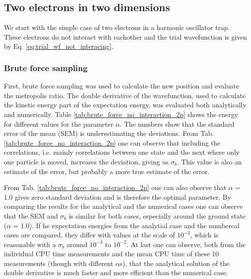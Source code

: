 \subsection{Two electrons in two dimensions}

We start with the simple case of two electrons in a harmonic oscillator trap. These electrons do not interact with eachother and the trial wavefunction is given by Eq. \ref{eq:trial_wf_not_interacing}. 

\subsubsection{Brute force sampling}

First, brute force sampling was used to calculate the new position and evaluate the metropolis ratio. The double derivative of the wavefunction, used to calculate the kinetic energy part of the expectation energy, was evaluated both analytically and numerically. Table \ref{tab:brute_force_no_interaction_2p} shows the energy for different values for the parameter $\alpha$. The numbers show that the standard error of the mean (SEM) is underestimating the deviations. From Tab. \ref{tab:brute_force_no_interaction_2p} one can observe that including the correlations, i.e. mainly correlations between one state and the next where only one particle is moved, increases the deviation, giving us $\sigma_b$. This value is also an estimate of the error, but probably a more true estimate of the error.

From Tab. \ref{tab:brute_force_no_interaction_2p} one can also observe that $\alpha $ = 1.0 gives zero standard deviation and is therefore the optimal parameter. By comparing the results for the analytical and the numerical cases one can observe that the SEM and $\sigma_b$ is similar for both cases, especially around the ground state ($\alpha$ = 1.0). If he expectation energies from the analytial case and the numbercal cases are compared, they differ with values at the scale of $10^{-3}$, which is reasonable with a $\sigma_b$ around $10^{-3}$ to $10^{-2}$. At last one can observe, both from the individual CPU time measurements and the mean CPU time of these 10 measurements (though with different $\alpha$s), that the analytical solution of the double derivative is much faster and more efficient than the numerical case. 

